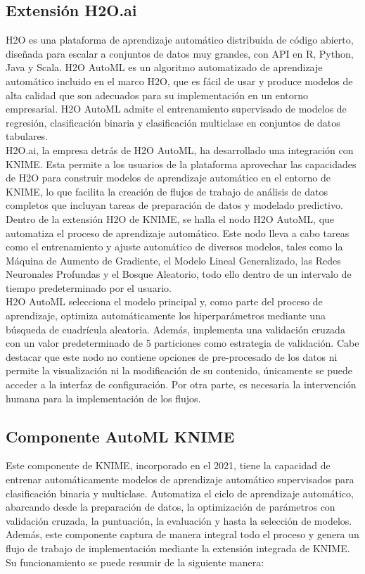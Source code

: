 \subsection{Extensión H2O.ai}
H2O es una plataforma de aprendizaje automático distribuida de código abierto, diseñada para escalar a conjuntos de datos muy grandes, con API en R, Python, Java y Scala. H2O AutoML \citep{ledell2020h2o} es un algoritmo automatizado de aprendizaje automático incluido en el marco H2O, que es fácil de usar y produce modelos de alta calidad que son adecuados para su implementación en un entorno empresarial. H2O AutoML admite el entrenamiento supervisado de modelos de regresión, clasificación binaria y clasificación multiclase en conjuntos de datos tabulares.\\
H2O.ai, la empresa detrás de H2O AutoML, ha desarrollado una integración con KNIME. Esta permite a los usuarios de la plataforma aprovechar las capacidades de H2O para construir modelos de aprendizaje automático en el entorno de KNIME, lo que facilita la creación de flujos de trabajo de análisis de datos completos que incluyan tareas de preparación de datos y modelado predictivo. Dentro de la extensión H2O de KNIME, se halla el nodo H2O AutoML, que automatiza el proceso de aprendizaje automático. Este nodo lleva a cabo tareas como el entrenamiento y ajuste automático de diversos modelos, tales como la Máquina de Aumento de Gradiente, el Modelo Lineal Generalizado, las Redes Neuronales Profundas y el Bosque Aleatorio, todo ello dentro de un intervalo de tiempo predeterminado por el usuario. \\
H2O AutoML selecciona el modelo principal y, como parte del proceso de aprendizaje, optimiza automáticamente los hiperparámetros mediante una búsqueda de cuadrícula aleatoria. Además, implementa una validación cruzada con un valor predeterminado de 5 particiones como estrategia de validación. Cabe destacar que este nodo no contiene opciones de pre-procesado de los datos ni permite la visualización ni la modificación de su contenido, únicamente se puede acceder a la interfaz de configuración. Por otra parte, es necesaria la intervención humana para la implementación de los flujos.

\subsection{Componente AutoML KNIME}
Este componente de KNIME, incorporado en el 2021, tiene la capacidad de entrenar automáticamente modelos de aprendizaje automático supervisados para clasificación binaria y multiclase. Automatiza el ciclo de aprendizaje automático, abarcando desde la preparación de datos, la optimización de parámetros con validación cruzada, la puntuación, la evaluación y hasta la selección de modelos. Además, este componente captura de manera integral todo el proceso y genera un flujo de trabajo de implementación mediante la extensión integrada de KNIME. Su funcionamiento se puede resumir de la siguiente manera:

